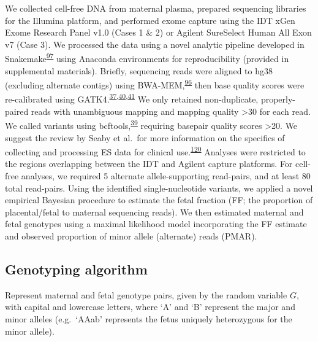 \documentclass[11pt,letterpaper,oneside]{book}
\begin{document}
We collected cell-free DNA from maternal plasma, prepared sequencing libraries for the Illumina platform, and performed exome capture using the IDT xGen Exome Research Panel v1.0 (Cases 1 \& 2) or Agilent SureSelect Human All Exon v7 (Case 3).
We processed the data using a novel analytic pipeline developed in Snakemake\textsuperscript{\protect\hyperlink{ref-koster:2012aa}{97}} using Anaconda environments for reproducibility (provided in supplemental materials).
Briefly, sequencing reads were aligned to hg38 (excluding alternate contigs) using BWA-MEM,\textsuperscript{\protect\hyperlink{ref-li:2013ab}{96}} then base quality scores were re-calibrated using GATK4.\textsuperscript{\protect\hyperlink{ref-mckenna:2010aa}{37},\protect\hyperlink{ref-van-der-auwera:2013aa}{40},\protect\hyperlink{ref-poplin:2018aa}{41}}
We only retained non-duplicate, properly-paired reads with unambiguous mapping and mapping quality \textgreater30 for each read.
We called variants using bcftools,\textsuperscript{\protect\hyperlink{ref-li:2011aa}{39}} requiring basepair quality scores \textgreater20.
We suggest the review by Seaby et al.~for more information on the specifics of collecting and processing ES data for clinical use.\textsuperscript{\protect\hyperlink{ref-seaby:2016aa}{120}}
Analyses were restricted to the regions overlapping between the IDT and Agilent capture platforms.
For cell-free analyses, we required 5 alternate allele-supporting read-pairs, and at least 80 total read-pairs.
Using the identified single-nucleotide variants, we applied a novel empirical Bayesian procedure to estimate the fetal fraction (FF; the proportion of placental/fetal to maternal sequencing reads).
We then estimated maternal and fetal genotypes using a maximal likelihood model incorporating the FF estimate and observed proportion of minor allele (alternate) reads (PMAR).

\hypertarget{genotyping-algorithm}{%
\subsection{Genotyping algorithm}\label{genotyping-algorithm}}

\newcommand{\Var}[2][]{\text{Var}_{#1}\left(#2\right)}
\newcommand\I[1]{\text{I}\left(#1\right)}

Represent maternal and fetal genotype pairs, given by the random variable \(G\), with capital and lowercase letters, where `A' and `B' represent the major and minor alleles (e.g.~`AAab' represents the fetus uniquely heterozygous for the minor allele).
\end{document}
